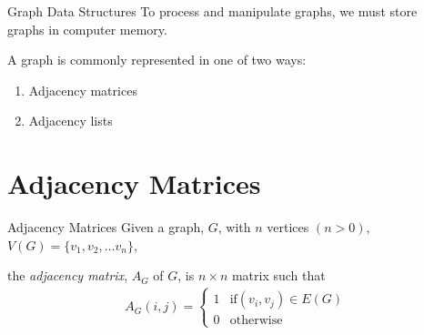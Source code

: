 \documentclass[14pt,aspectratio=1610]{beamer}
\begin{document}
\begin{frame}{Graph Data Structures}
  To process and manipulate graphs, we must store \\graphs in computer memory.
  
  A graph is commonly represented in one of two ways:
  \begin{enumerate}
    \item
      Adjacency matrices
    \item
      Adjacency lists
  \end{enumerate}
\end{frame}


\section{Adjacency Matrices}

\begin{frame}{Adjacency Matrices}
Given a graph, \(G\), with \(n\) vertices \((n > 0)\), \\
\(V(G) = \{v_1, v_2, \ldots v_n\}\),

the \emph{adjacency matrix}, \(A_G\) of \(G\), is \(n \times n\) matrix such that
\begin{align}
A_G(i, j) =
  \begin{cases}
    1 & \mathrm{if} (v_i, v_j) \in E(G) \\
    0 & \mathrm{otherwise}
  \end{cases}
\end{align}
\end{frame}
\end{document}
